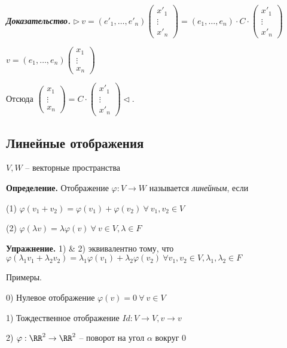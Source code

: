 \textbf{\textit{Доказательство.}} $\rhd \ v = (e'_1, \dots, e'_n) \begin{pmatrix} x'_1 \\ \vdots \\ x'_n \end{pmatrix} = (e_1, \dots, e_n) \cdot C \cdot \begin{pmatrix} x'_1 \\ \vdots \\ x'_n \end{pmatrix}$

$v = (e_1, \dots, e_n) \begin{pmatrix} x_1 \\ \vdots \\ x_n \end{pmatrix}$

Отсюда $\begin{pmatrix} x_1 \\ \vdots \\ x_n \end{pmatrix} = C \cdot \begin{pmatrix} x'_1 \\ \vdots \\ x'_n \end{pmatrix} \lhd$.

\subsection{Линейные отображения}
$V, W$ -- векторные пространства

\bigskip
\textbf{Определение.} Отображение $\varphi: V \rightarrow W$ называется \textit{линейным}, если 

(1) $\varphi(v_1 + v_2) = \varphi(v_1) + \varphi(v_2) \ \forall \ v_1, v_2 \in V$

(2) $\varphi(\lambda v) = \lambda \varphi(v) \ \forall \ v \in V, \lambda \in F$

\bigskip
\textbf{Упражнение.} 1) \& 2) эквивалентно тому, что $\varphi(\lambda_1 v_1 + \lambda_2 v_2) = \lambda_1 \varphi(v_1) + \lambda_2 \varphi(v_2) \ \forall v_1, v_2 \in V, \lambda_1, \lambda_2 \in F$

\bigskip
Примеры.

0) Нулевое отображение $\varphi (v) = 0 \ \forall \ v \in V$

1) Тождественное отображение $Id: V \rightarrow V, v \rightarrow v$

2) $\varphi: \RR^2 \rightarrow \RR^2$ -- поворот на угол $\alpha$ вокруг 0

